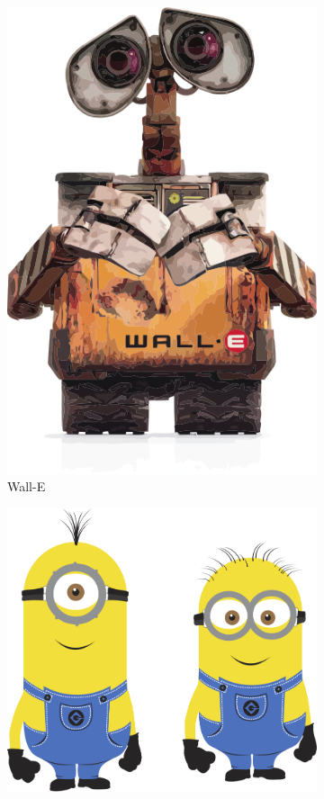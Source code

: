 \begin{landscape}
\begin{figure}
\begin{subfigure}[b]{0.3\textwidth}
			\includegraphics[width=\textwidth]{WallE}
			\caption{Wall-E}
			\label{fig:WallE}
		\end{subfigure}             
		\begin{subfigure}[b]{0.3\textwidth}
			\includegraphics[width=\textwidth]{minion}

\end{subfigure}
\end{figure}
\end{landscape}
